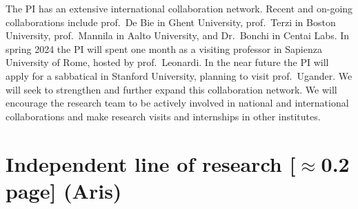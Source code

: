 \documentclass[a4paper,11pt]{article}
\begin{document}

The PI has an extensive international collaboration network. 
Recent and on-going collaborations include
prof.\ De Bie in Ghent University, 
prof.\ Terzi in Boston University,
prof.\ Mannila in Aalto University, and 
Dr.\ Bonchi in Centai Labs.
In spring 2024 the PI will spent one month as a visiting professor 
in Sapienza University of Rome, hosted by prof.\ Leonardi.
In the near future the PI will apply for a sabbatical in Stanford University, 
planning to visit prof.\ Ugander. 
We will seek to strengthen and further expand this collaboration network.
We will encourage the research team to be actively involved in national and international collaborations
and make research visits and internships in other institutes.

\section{Independent line of research {\color{orange}[$\approx$0.2 page]} {\color{teal}(Aris)}}



\iffalse
{\small
\setlength{\bibsep}{0pt}


}
\fi

% 
\end{document}
